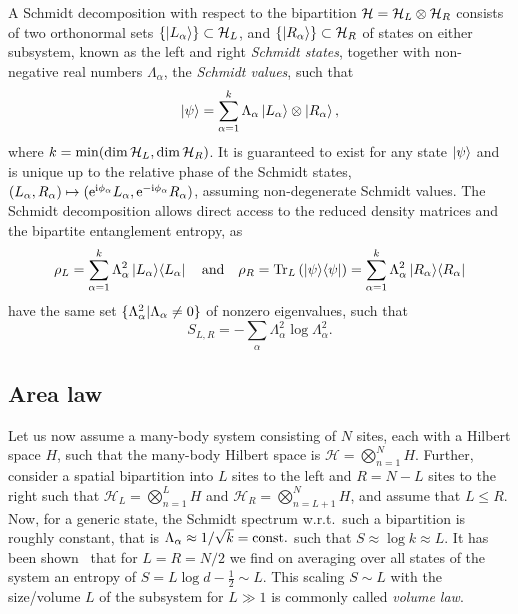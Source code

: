 %
A Schmidt decomposition with respect to the bipartition $\mathcal{H} = \mathcal{H}_L \otimes \mathcal{H}_R$ consists of two orthonormal sets $\set{\ket{L_\alpha}} \subset \hilbert_L$, and $\set{\ket{R_\alpha}} \subset \hilbert_R$ of states on either subsystem, known as the left and right \emph{Schmidt states}, together with non-negative real numbers $\Lambda_\alpha$, the \emph{Schmidt values}, such that
\begin{equation}
    \label{eq:tensornets:entanglement:schmidt_decomposition}
    \psiket = \sum_{\alpha=1}^k \Lambda_\alpha \ket{L_\alpha} \otimes \ket{R_\alpha},
\end{equation}
where $k = \min(\dim\mathcal{H}_L, \dim\mathcal{H}_R)$.
%
It is guaranteed to exist for any state $\ket{\psi}$ and is unique up to the relative phase of the Schmidt states, $(L_\alpha, R_\alpha) \mapsto (\mathrm{e}^{\mathrm{i}\phi_\alpha} L_\alpha, \mathrm{e}^{-\mathrm{i}\phi_\alpha} R_\alpha)$, assuming non-degenerate Schmidt values.
%
The Schmidt decomposition allows direct access to the reduced density matrices and the bipartite entanglement entropy, as
\begin{equation}
    \label{eq:tensornets:entanglement:RDMs_from_schmidt_descomp}
    \rho_L = \sum_{\alpha=1}^k \Lambda_\alpha^2 \ketbra{L_\alpha}{L_\alpha}
    \quad \text{and} \quad 
    \rho_R = \trArg{L}{\ketbra{\psi}{\psi}} = \sum_{\alpha=1}^k \Lambda_\alpha^2 \ketbra{R_\alpha}{R_\alpha}
\end{equation}
have the same set $\setdef{\Lambda_\alpha^2}{\Lambda_\alpha \neq 0}$ of nonzero eigenvalues, such that
\begin{equation}
    \label{eq:tensornets:entanglement:bipartite_entropy_from_schmidt_decomp}
    S_{L,R} = -\sum_\alpha \Lambda_\alpha^2 \log \Lambda_\alpha^2
    .
\end{equation}

\subsection{Area law}

Let us now assume a many-body system consisting of $N$ sites, each with a Hilbert space $H$, such that the many-body Hilbert space is $\mathcal{H} = \bigotimes_{n=1}^{N} H$.
%
Further, consider a spatial bipartition into $L$ sites to the left and $R = N - L$ sites to the right such that $\mathcal{H}_L = \bigotimes_{n=1}^{L} H$ and $\mathcal{H}_R = \bigotimes_{n=L + 1}^{N} H$, and assume that $L \leq R$.
%
Now, for a generic state, the Schmidt spectrum w.r.t.~such a bipartition is roughly constant, that is $\Lambda_\alpha \approx 1 / \sqrt{k} = \mathrm{const.}$ such that $S \approx \log k \approx L$.
%
It has been shown~\cite{page1993} that for $L = R = N/2$ we find on averaging over all states of the system an entropy of $S = L \log d - \tfrac{1}{2} \sim L$.
%
This scaling $S \sim L$ with the size/volume $L$ of the subsystem for $L \gg 1$ is commonly called \emph{volume law}.

